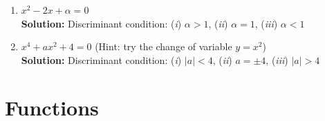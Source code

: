 \documentclass{article}
\begin{document}
\begin{enumerate}[leftmargin = 0.5cm, label = \arabic*., rightmargin = 0.2cm]
    \begin{enumerate}[leftmargin = 0.5cm, label = (\alph*), rightmargin = 0.2cm]

    \item $x^2 - 2x + \alpha = 0$ \\
    \textbf{Solution:} Discriminant condition: (\textit{i}) $\alpha > 1$, (\textit{ii}) $\alpha = 1$, (\textit{iii}) $\alpha < 1$

    \item $x^4 + ax^2 + 4 = 0$ (Hint: try the change of variable $y = x^2$) \\
    \textbf{Solution:} Discriminant condition: (\textit{i}) $|a| < 4$, (\textit{ii}) $a = \pm4$, (\textit{iii}) $|a| > 4$
        
    \end{enumerate}
    
    \end{enumerate}

\section{Functions}
\end{document}

